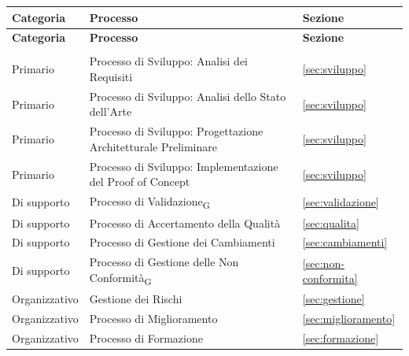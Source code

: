 \begin{xltabular}{\textwidth}{
    >{\raggedright\arraybackslash}p{3cm}
    >{\raggedright\arraybackslash}X
    >{\raggedright\arraybackslash}p{3cm}
}
    \toprule
    \textbf{Categoria} & \textbf{Processo} & \textbf{Sezione} \\
    \midrule
    \endfirsthead

    \toprule
    \textbf{Categoria} & \textbf{Processo} & \textbf{Sezione} \\
    \midrule
    \endhead

    \midrule
     \\
    \endfoot

    \bottomrule
    \endlastfoot

    Primario
    & Processo di Sviluppo: Analisi dei Requisiti
    & \ref{sec:sviluppo} \\

    Primario
    & Processo di Sviluppo: Analisi dello Stato dell'Arte
    & \ref{sec:sviluppo} \\

    Primario
    & Processo di Sviluppo: Progettazione Architetturale Preliminare
    & \ref{sec:sviluppo} \\

    Primario
    & Processo di Sviluppo: Implementazione del Proof of Concept
    & \ref{sec:sviluppo} \\

    Di supporto
    & Processo di Validazione\textsubscript{G}
    & \ref{sec:validazione} \\

    Di supporto
    & Processo di Accertamento della Qualità
    & \ref{sec:qualita} \\

    Di supporto
    & Processo di Gestione dei Cambiamenti
    & \ref{sec:cambiamenti} \\

    Di supporto
    & Processo di Gestione delle Non Conformità\textsubscript{G}
    & \ref{sec:non-conformita} \\

    Organizzativo
    & Gestione dei Rischi
    & \ref{sec:gestione} \\

    Organizzativo
    & Processo di Miglioramento
    & \ref{sec:miglioramento} \\

    Organizzativo
    & Processo di Formazione
    & \ref{sec:formazione} \\

\end{xltabular}

